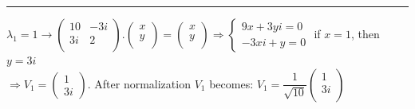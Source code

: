 \documentclass[fleqn]{article}
\begin{document}
\begin{enumerate}
      \textcolor{hwColor}{
        \rule{16cm}{0.4pt}
      }

      \textcolor{hwColor}{
        $
         \lambda_1=1 \rightarrow \begin{pmatrix}
          10 & -3i \\
          3i & 2 \\
         \end{pmatrix}.\begin{pmatrix}
           x \\
           y \\
         \end{pmatrix}=\begin{pmatrix}
          x \\
          y \\
        \end{pmatrix} \Longrightarrow 
        \begin{cases}
          9x+3yi=0 \\
          -3xi+y=0
        \end{cases} 
        $
        if $x=1$, then $y=3i$ \\
        $
          \Longrightarrow
          V_1=\begin{pmatrix}
            1 \\
            3i
          \end{pmatrix}
        $.
        After normalization $V_1$ becomes:
        $
        V_1=\dfrac{1}{\sqrt{10}}\begin{pmatrix}
          1 \\
          3i \\
        \end{pmatrix}
        $
      }


\end{enumerate}
\end{document}
